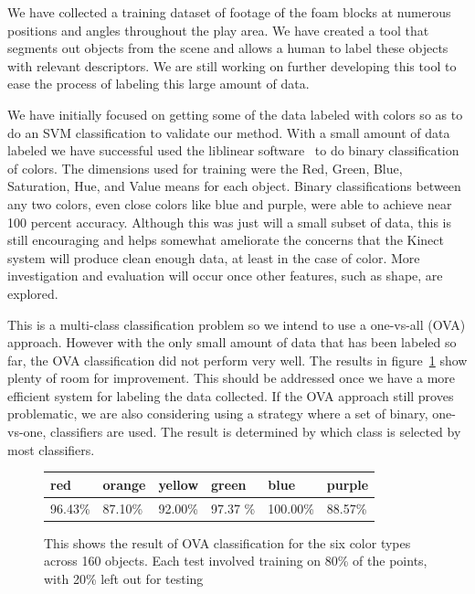 \documentclass[11pt]{article}
\newcommand\T{\rule{0pt}{3ex}}
\newcommand\B{\rule[-1.2ex]{0pt}{0pt}}
\begin{document}
We have collected a training dataset of footage of the foam blocks at numerous
positions and angles throughout the play area. We have created a tool that
segments out objects from the scene and allows a human to label these objects
with relevant descriptors.  We are still working on further developing this
tool to ease the process of labeling this large amount of data.


We have initially focused on getting some of the data labeled with colors so as
to do an SVM classification to validate our method.  With a small amount of
data labeled we have successful used the liblinear software~\cite{LIBLINEAR} to do
binary classification of colors.  The dimensions used for training were the
Red, Green, Blue, Saturation, Hue, and Value means for each object.  Binary
classifications between any two colors, even close colors like blue and purple,
were able to achieve near 100 percent accuracy.  Although this was just will a
small subset of data, this is still encouraging and helps somewhat ameliorate
the concerns that the Kinect system will produce clean enough data, at least in
the case of color.  More investigation and evaluation will occur once other
features, such as shape, are explored.

This is a multi-class classification problem so we intend to use a one-vs-all
(OVA) approach.  However with the only small amount of data that has been
labeled so far, the OVA classification did not perform very well. The results in figure~\ref{fig:testresults} show plenty of room for improvement. This should
be addressed once we have a more efficient system for labeling the data
collected.  If the OVA approach still proves problematic, we are also
considering using a strategy where a set of binary, one-vs-one, classifiers are
used.  The result is determined by which class is selected by most classifiers.

\begin{figure}
\centering
    \begin{tabular}{ | l | l | l | l | l | l |}
    \hline
    red & orange & yellow & green & blue & purple \T \B \\ \hline
    96.43\% & 87.10\% & 92.00\% & 97.37 \% & 100.00\% & 88.57\% \B \T \\ \hline
\end{tabular}
\caption{This shows the result of OVA classification for the six color types across 160 objects. Each test involved training on 80\% of the points, with 20\% left out for testing}
\label{fig:testresults}
\end{figure}
\end{document}
